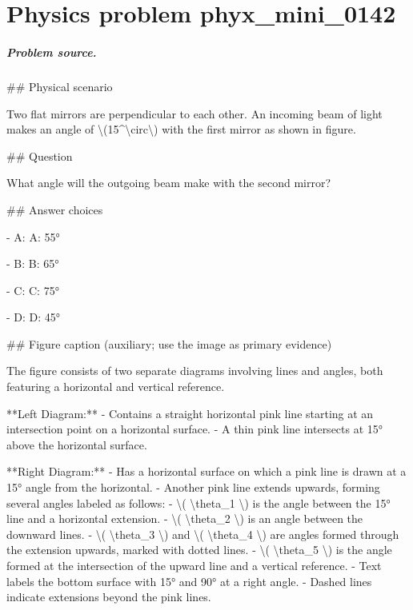 
\chapter{Physics problem phyx\_mini\_0142}
\label{ch:PhyXMiniProblems_problem_phyx_mini_0142}

\paragraph{Problem source.}
\#\# Physical scenario

Two flat mirrors are perpendicular to each other. An incoming beam of light makes an angle of \textbackslash{}(15\textasciicircum{}\textbackslash{}circ\textbackslash{}) with the first mirror as shown in figure.

\#\# Question

What angle will the outgoing beam make with the second mirror?

\#\# Answer choices

- A: A: 55°

- B: B: 65°

- C: C: 75°

- D: D: 45°

\#\# Figure caption (auxiliary; use the image as primary evidence)

The figure consists of two separate diagrams involving lines and angles, both featuring a horizontal and vertical reference.

**Left Diagram:**
- Contains a straight horizontal pink line starting at an intersection point on a horizontal surface.
- A thin pink line intersects at 15° above the horizontal surface.

**Right Diagram:**
- Has a horizontal surface on which a pink line is drawn at a 15° angle from the horizontal.
- Another pink line extends upwards, forming several angles labeled as follows:
  - \textbackslash{}( \textbackslash{}theta\_1 \textbackslash{}) is the angle between the 15° line and a horizontal extension.
  - \textbackslash{}( \textbackslash{}theta\_2 \textbackslash{}) is an angle between the downward lines.
  - \textbackslash{}( \textbackslash{}theta\_3 \textbackslash{}) and \textbackslash{}( \textbackslash{}theta\_4 \textbackslash{}) are angles formed through the extension upwards, marked with dotted lines.
  - \textbackslash{}( \textbackslash{}theta\_5 \textbackslash{}) is the angle formed at the intersection of the upward line and a vertical reference.
- Text labels the bottom surface with 15° and 90° at a right angle.
- Dashed lines indicate extensions beyond the pink lines.

